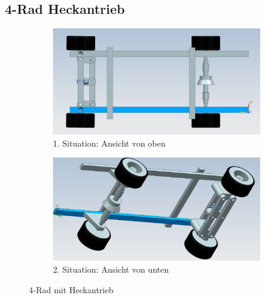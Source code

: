 \subsection{4-Rad Heckantrieb}

\begin{figure} [hbp]
	\centering
	\begin{subfigure}[b]{0.45\textwidth}
		\includegraphics[width=\textwidth]{fig/4Rad-1.JPG}
		\caption{1. Situation: Ansicht von oben}
	\end{subfigure}
	\hfill
	\begin{subfigure}[b]{0.45\textwidth}
		\includegraphics[width=\textwidth]{fig/4Rad-2.JPG}
		\caption{2. Situation: Ansicht von unten}
\end{subfigure}
	\caption{4-Rad mit Heckantrieb}\label{fig:animals}
\end{figure}

